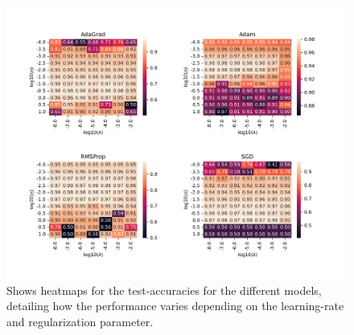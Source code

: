 \documentclass{article}
\begin{document}
\begin{figure}
	\centerline{\includegraphics[scale=0.7]{nn_test_accuracy_hm}}
	\caption{Shows heatmaps for the test-accuracies for the different
		models, detailing how the performance varies depending on the
		learning-rate and regularization parameter.}
	\label{nntestacchm}
\end{figure}
\end{document}
